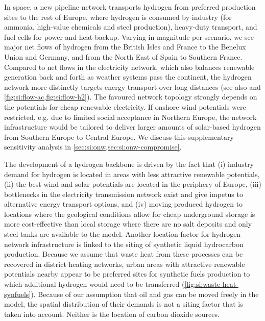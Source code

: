 In space, a new pipeline network transports hydrogen from preferred production
sites to the rest of Europe, where hydrogen is consumed by industry (for
ammonia, high-value chemicals and steel production), heavy-duty transport, and
fuel cells for power and heat backup. Varying in magnitude per scenario, we see
major net flows of hydrogen from the British Isles and France to the Benelux
Union and Germany, and from the North East of Spain to Southern France. Compared
to net flows in the electricity network, which also balances renewable
generation back and forth as weather systems pass the continent, the hydrogen
network more distinctly targets energy transport over long distances (see also
 and \cref{fig:si:flow-ac,fig:si:flow-h2}). The
favoured network topology strongly depends on the potentials for cheap renewable
electricity. If onshore wind potentials were restricted, e.g. due to limited
social acceptance in Northern Europe, the network infrastructure would be
tailored to deliver larger amounts of solar-based hydrogen from Southern Europe
to Central Europe. We discuss this supplementary sensitivity analysis in
\cref{sec:si:onw,sec:si:onw-compromise}.

The development of a hydrogen backbone is driven by the fact that (i) industry
demand for hydrogen is located in areas with less attractive renewable
potentials, (ii) the best wind and solar potentials are located in the periphery
of Europe, (iii) bottlenecks in the electricity transmission network exist and
give impetus to alternative energy transport options, and (iv) moving produced
hydrogen to locations where the geological conditions allow for cheap
underground storage is more cost-effective than local storage where there are no
salt deposits and only steel tanks are available to the model. Another location
factor for hydrogen network infrastructure is linked to the siting of synthetic
liquid hydrocarbon production. Because we assume that waste heat from these
processes can be recovered in district heating networks, urban areas with
attractive renewable potentials nearby appear to be preferred sites for
synthetic fuels production to which additional hydrogen would need to be
transferred (\cref{fig:si:waste-heat-synfuels}). Because of our assumption that
oil and gas can be moved freely in the model, the spatial distribution of their
demands is not a siting factor that is taken into account. Neither is the
location of carbon dioxide sources.

